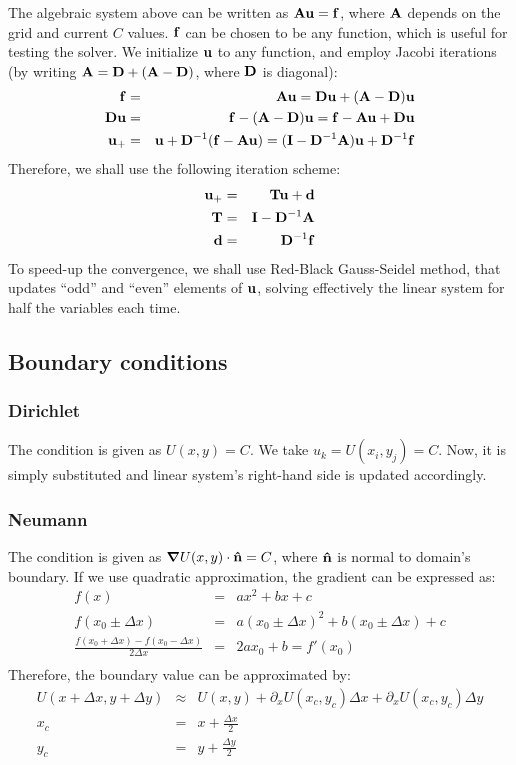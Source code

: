 The algebraic system above can be written as $\mathbf{A} \mathbf{u} = \mathbf{f}$,
where $\mathbf{A}$ depends on the grid and current $C$ values.
$\mathbf{f}$ can be chosen to be any function, which is useful for testing the solver.
We initialize $\mathbf{u}$ to any function, and employ Jacobi iterations
(by writing $\mathbf{A} = \mathbf{D} + (\mathbf{A-D})$, where $\mathbf{D}$ is diagonal):
\begin{eqnarray}
\mathbf{f} &=& \mathbf{A}\mathbf{u} = \mathbf{D}\mathbf{u} + (\mathbf{A-D})\mathbf{u} \\
\mathbf{D}\mathbf{u} &=& \mathbf{f} - (\mathbf{A-D})\mathbf{u} =
\mathbf{f} - \mathbf{A}\mathbf{u} + \mathbf{D}\mathbf{u} \\
\mathbf{u}_+ &=& \mathbf{u} + \mathbf{D}^{-1}(\mathbf{f} - \mathbf{A}\mathbf{u}) =
(\mathbf{I} - \mathbf{D}^{-1}\mathbf{A}) \mathbf{u} + \mathbf{D}^{-1}\mathbf{f} \\
\end{eqnarray}
Therefore, we shall use the following iteration scheme:
\begin{eqnarray}
\mathbf{u}_+ &=& \mathbf{T}\mathbf{u} + \mathbf{d} \\
\mathbf{T} &=& \mathbf{I} - \mathbf{D}^{-1}\mathbf{A} \\
\mathbf{d} &=& \mathbf{D}^{-1}\mathbf{f}
\end{eqnarray}
To speed-up the convergence, we shall use Red-Black Gauss-Seidel method,
that updates ``odd'' and ``even'' elements of $\mathbf{u}$, solving
effectively the linear system for half the variables each time.
\subsection{Boundary conditions}
\subsubsection{Dirichlet}
The condition is given as $U(x, y) = C$.
We take $u_k = U(x_i, y_j) = C$.
Now, it is simply substituted and
linear system's right-hand side is updated accordingly.

\subsubsection{Neumann}
The condition is given as $\boldsymbol{\nabla} U(x,y) \cdot \mathbf{\hat n} = C$,
where $\mathbf{\hat n}$ is normal to domain's boundary.
If we use quadratic approximation, the gradient can be expressed as:
\begin{eqnarray}
  f(x) &=& ax^2 + bx + c \\
  f(x_0 \pm \Delta x) &=&
   a(x_0 \pm \Delta x)^2 + b(x_0 \pm \Delta x) + c \\
  \frac{f(x_0 + \Delta x) - f(x_0 - \Delta x)}{2\Delta x} &=&
   2a x_0 + b = f'(x_0) \\
\end{eqnarray}
Therefore, the boundary value can be approximated by:
\begin{eqnarray}
 U(x + \Delta x,y + \Delta y) &\approx& U(x, y) + \partial_x U(x_c,y_c) \Delta x +
 \partial_x U(x_c,y_c) \Delta y \\
 x_c &=& x + \frac{\Delta x}{2} \\
 y_c &=& y + \frac{\Delta y}{2}
\end{eqnarray}

